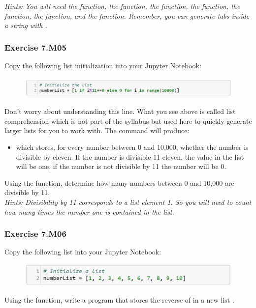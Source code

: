 \textit{Hints:
You will need the {} function, the {} function, the {} function, the {} function, the {} function, the {} function, and the {} function. Remember, you can generate tabs inside a string with {}.}\\[1cm]




\subsubsection*{Exercise 7.M05}
Copy the following list initialization into your Jupyter Notebook:
\begin{figure}[H]
		\centering
		\includegraphics[width=\textwidth]{../IMG/7M05.png} 
\end{figure}
Don’t worry about understanding this line. What you see above is called list comprehension which is not part of the syllabus but used here to quickly generate larger lists for you to work with. The command will produce:
\begin{itemize}
	\item {} which stores, for every number between 0 and 10,000, whether the
number is divisible by eleven. If the number is divisible 11 eleven, the value in the list
will be one, if the number is not divisible by 11 the number will be 0.
\end{itemize}
Using the {} function, determine how many numbers between 0 and 10,000 are
divisible by 11.\\


\textit{Hints:
Divisibility by 11 corresponds to a list element 1. So you will need to count how many times
the number one is contained in the list.}\\[1cm]




\subsubsection*{Exercise 7.M06}
Copy the following list into your Jupyter Notebook:
\begin{figure}[H]
		\centering
		\includegraphics[width=\textwidth]{../IMG/7M06.png} 
\end{figure}
Using the {} function, write a program that stores the reverse of {} in a new list {}.\\


